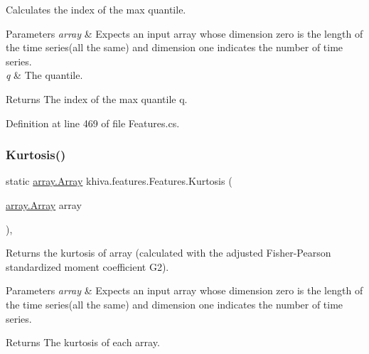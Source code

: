 Calculates the index of the max quantile. 


\begin{DoxyParams}{Parameters}
{\em array} & Expects an input array whose dimension zero is the length of the time series(all the same) and dimension one indicates the number of time series.\\
\hline
{\em q} & The quantile.\\
\hline
\end{DoxyParams}
\begin{DoxyReturn}{Returns}
The index of the max quantile q.
\end{DoxyReturn}


Definition at line 469 of file Features.\+cs.

\mbox{\label{classkhiva_1_1features_1_1_features_a911d30988298ecd88427bec4ee37d0c8}} 
\subsubsection{\texorpdfstring{Kurtosis()}{Kurtosis()}}
{\footnotesize\ttfamily static \mbox{\hyperlink{classkhiva_1_1array_1_1_array}{array.\+Array}} khiva.\+features.\+Features.\+Kurtosis (\begin{DoxyParamCaption}\item[{\mbox{\hyperlink{classkhiva_1_1array_1_1_array}{array.\+Array}}}]{array }\end{DoxyParamCaption})\hspace{0.3cm}{\ttfamily [inline]}, {\ttfamily [static]}}



Returns the kurtosis of array (calculated with the adjusted Fisher-\/\+Pearson standardized moment coefficient G2). 


\begin{DoxyParams}{Parameters}
{\em array} & Expects an input array whose dimension zero is the length of the time series(all the same) and dimension one indicates the number of time series.\\
\hline
\end{DoxyParams}
\begin{DoxyReturn}{Returns}
The kurtosis of each array.
\end{DoxyReturn}


